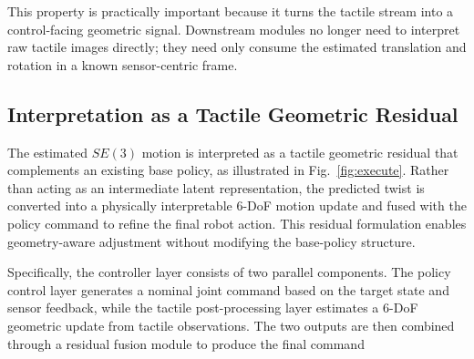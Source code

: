 \documentclass[letterpaper,10pt,journal,twoside]{IEEEtran}
\begin{document}
This property is practically important because it turns the tactile stream into a control-facing geometric signal. Downstream modules no longer need to interpret raw tactile images directly; they need only consume the estimated translation and rotation in a known sensor-centric frame.




\subsection{Interpretation as a Tactile Geometric Residual}
\label{subsec:interpretation}

The estimated $SE(3)$ motion is interpreted as a tactile geometric residual that complements an existing base policy, as illustrated in Fig.~\ref{fig:execute}. Rather than acting as an intermediate latent representation, the predicted twist is converted into a physically interpretable 6-DoF motion update and fused with the policy command to refine the final robot action. This residual formulation enables geometry-aware adjustment without modifying the base-policy structure.

Specifically, the controller layer consists of two parallel components. The policy control layer generates a nominal joint command based on the target state and sensor feedback, while the tactile post-processing layer estimates a 6-DoF geometric update from tactile observations. The two outputs are then combined through a residual fusion module to produce the final command
\end{document}
